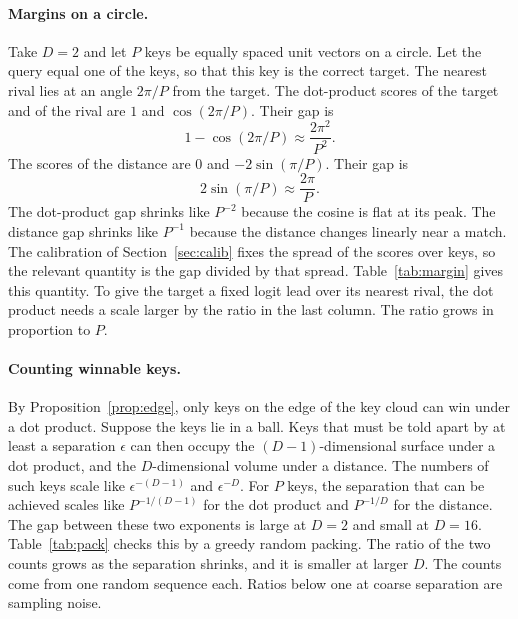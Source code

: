 \documentclass[11pt]{article}
\begin{document}
\paragraph{Margins on a circle.}
Take $D=2$ and let $P$ keys be equally spaced unit vectors on a circle.
Let the query equal one of the keys, so that this key is the correct target.
The nearest rival lies at an angle $2\pi/P$ from the target.
The dot-product scores of the target and of the rival are $1$ and $\cos(2\pi/P)$.
Their gap is
\begin{equation}
1-\cos(2\pi/P)\approx\frac{2\pi^2}{P^2}.
\end{equation}
The scores of the distance are $0$ and $-2\sin(\pi/P)$.
Their gap is
\begin{equation}
2\sin(\pi/P)\approx\frac{2\pi}{P}.
\end{equation}
The dot-product gap shrinks like $P^{-2}$ because the cosine is flat at its peak.
The distance gap shrinks like $P^{-1}$ because the distance changes linearly near a match.
The calibration of Section~\ref{sec:calib} fixes the spread of the scores over keys, so the relevant quantity is the gap divided by that spread.
Table~\ref{tab:margin} gives this quantity.
To give the target a fixed logit lead over its nearest rival, the dot product needs a scale larger by the ratio in the last column.
The ratio grows in proportion to $P$.

\begin{table}[h]
\centering\small

\caption{Score gap between a key and its nearest rival, divided by the standard deviation of the scores over all keys, for $P$ equally spaced unit vectors on a circle. The last column is the ratio of the distance value to the dot-product value.}
\label{tab:margin}
\end{table}

\paragraph{Counting winnable keys.}
By Proposition~\ref{prop:edge}, only keys on the edge of the key cloud can win under a dot product.
Suppose the keys lie in a ball.
Keys that must be told apart by at least a separation $\epsilon$ can then occupy the $(D-1)$-dimensional surface under a dot product, and the $D$-dimensional volume under a distance.
The numbers of such keys scale like $\epsilon^{-(D-1)}$ and $\epsilon^{-D}$.
For $P$ keys, the separation that can be achieved scales like $P^{-1/(D-1)}$ for the dot product and $P^{-1/D}$ for the distance.
The gap between these two exponents is large at $D=2$ and small at $D=16$.
Table~\ref{tab:pack} checks this by a greedy random packing.
The ratio of the two counts grows as the separation shrinks, and it is smaller at larger $D$.
The counts come from one random sequence each.
Ratios below one at coarse separation are sampling noise.
\end{document}
